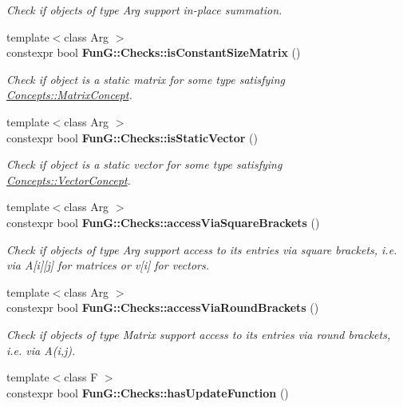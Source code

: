 \begin{DoxyCompactItemize}
\begin{DoxyCompactList}\small\item\em Check if objects of type Arg support in-\/place summation. \end{DoxyCompactList}\item 
{\footnotesize template$<$class Arg $>$ }\\constexpr bool {\bfseries Fun\-G\-::\-Checks\-::is\-Constant\-Size\-Matrix} ()
\begin{DoxyCompactList}\small\item\em Check if object is a static matrix for some type satisfying \hyperlink{structFunG_1_1Concepts_1_1MatrixConcept}{Concepts\-::\-Matrix\-Concept}. \end{DoxyCompactList}\item 
{\footnotesize template$<$class Arg $>$ }\\constexpr bool {\bfseries Fun\-G\-::\-Checks\-::is\-Static\-Vector} ()
\begin{DoxyCompactList}\small\item\em Check if object is a static vector for some type satisfying \hyperlink{structFunG_1_1Concepts_1_1VectorConcept}{Concepts\-::\-Vector\-Concept}. \end{DoxyCompactList}\item 
\hypertarget{namespaceFunG_1_1Checks_acb070f750b3e73f5c6cdfaaf0bc29c77}{{\footnotesize template$<$class Arg $>$ }\\constexpr bool {\bfseries Fun\-G\-::\-Checks\-::access\-Via\-Square\-Brackets} ()}\label{namespaceFunG_1_1Checks_acb070f750b3e73f5c6cdfaaf0bc29c77}

\begin{DoxyCompactList}\small\item\em Check if objects of type Arg support access to its entries via square brackets, i.\-e. via A\mbox{[}i\mbox{]}\mbox{[}j\mbox{]} for matrices or v\mbox{[}i\mbox{]} for vectors. \end{DoxyCompactList}\item 
\hypertarget{namespaceFunG_1_1Checks_a1006ff0348d78bf2a4d6dbe1b51586d6}{{\footnotesize template$<$class Arg $>$ }\\constexpr bool {\bfseries Fun\-G\-::\-Checks\-::access\-Via\-Round\-Brackets} ()}\label{namespaceFunG_1_1Checks_a1006ff0348d78bf2a4d6dbe1b51586d6}

\begin{DoxyCompactList}\small\item\em Check if objects of type Matrix support access to its entries via round brackets, i.\-e. via A(i,j). \end{DoxyCompactList}\item 
\hypertarget{namespaceFunG_1_1Checks_a600c419e4c393f442199465579dc1306}{{\footnotesize template$<$class F $>$ }\\constexpr bool {\bfseries Fun\-G\-::\-Checks\-::has\-Update\-Function} ()}\label{namespaceFunG_1_1Checks_a600c419e4c393f442199465579dc1306}


\end{DoxyCompactItemize}
